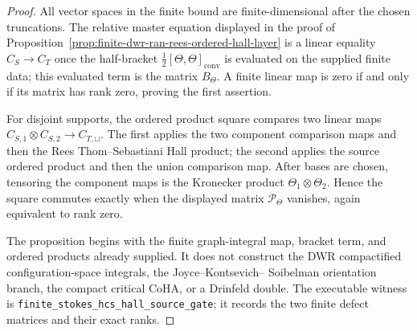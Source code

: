 \begin{proof}
All vector spaces in the finite bound are finite-dimensional after the
chosen truncations. The relative master equation displayed in the proof
of Proposition~\ref{prop:finite-dwr-ran-rees-ordered-hall-layer} is a
linear equality \(C_S\to C_T\) once the half-bracket
\(\frac12[\Theta,\Theta]_{\mathrm{conv}}\) is evaluated on the supplied
finite data; this evaluated term is the matrix \(B_\Theta\). A finite
linear map is zero if and only if its matrix has rank zero, proving the
first assertion.

For disjoint supports, the ordered product square compares two linear
maps \(C_{S,1}\otimes C_{S,2}\to C_{T,\sqcup}\). The first applies the
two component comparison maps and then the Rees Thom--Sebastiani Hall
product; the second applies the source ordered product and then the
union comparison map. After bases are chosen, tensoring the component
maps is the Kronecker product \(\Theta_1\otimes\Theta_2\). Hence the
square commutes exactly when the displayed matrix
\(\mathcal P_\Theta\) vanishes, again equivalent to rank zero.

The proposition begins with the finite graph-integral map, bracket
term, and ordered products already supplied. It does not construct the
DWR compactified configuration-space integrals, the Joyce--Kontsevich--
Soibelman orientation branch, the compact critical CoHA, or a Drinfeld
double. The executable witness is
\texttt{finite\_stokes\_hcs\_hall\_source\_gate}; it records the two
finite defect matrices and their exact ranks.
\end{proof}

